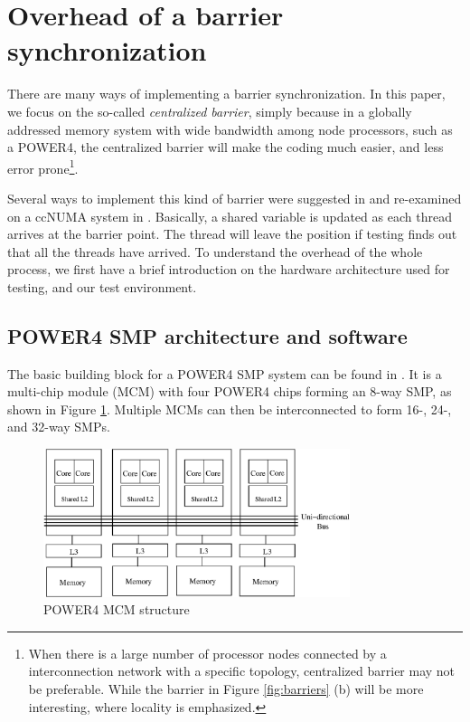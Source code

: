 
\section{Overhead of a barrier synchronization}
\label{overhead}

There are many ways of implementing a barrier synchronization. In this
paper, we focus on the so-called \emph{centralized barrier}, simply
because in a globally addressed memory system with wide bandwidth
among node processors, such as a POWER4, the centralized barrier will
make the coding much easier, and less error prone\footnote {When there
  is a large number of processor nodes connected by a interconnection
  network with a specific topology, centralized barrier may not be
  preferable. While the barrier in Figure \ref{fig:barriers} (b) will
  be more interesting, where locality is emphasized.}.

Several ways to implement this kind of barrier were suggested in
\cite{Mel91} and re-examined on a ccNUMA system in \cite{Nik99}.
Basically, a shared variable is updated as each thread arrives at the
barrier point. The thread will leave the position if testing finds out
that all the threads have arrived. To understand the overhead of the
whole process, we first have a brief introduction on the 
hardware architecture used for testing, and our test
environment.

\subsection{POWER4 SMP architecture and software}

The basic building block for a POWER4 SMP system can be found in
\cite{Ste01}. It is a multi-chip module (MCM) with four POWER4 chips
forming an 8-way SMP, as shown in Figure \ref{fig:mcm}.  Multiple MCMs
can then be interconnected to form 16-, 24-, and 32-way SMPs.

\begin{figure}[hbt]
  \begin{center}
    \includegraphics[angle=0, width=0.8\textwidth]{power4mcm.eps}
    \caption{POWER4 MCM structure}
    \label{fig:mcm}
  \end{center}
\end{figure}

